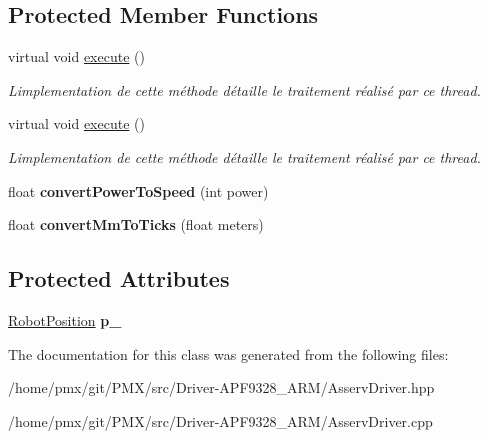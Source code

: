 \subsection*{Protected Member Functions}
\begin{DoxyCompactItemize}
\item 
\mbox{\label{classAsservDriver_ae2fdf0d75abab4e2cc974706c8a81867}} 
virtual void \hyperlink{classAsservDriver_ae2fdf0d75abab4e2cc974706c8a81867}{execute} ()
\begin{DoxyCompactList}\small\item\em L\textquotesingle{}implementation de cette méthode détaille le traitement réalisé par ce thread. \end{DoxyCompactList}\item 
\mbox{\label{classAsservDriver_a43527b66274f2c5f0e8e88adcd7cced2}} 
virtual void \hyperlink{classAsservDriver_a43527b66274f2c5f0e8e88adcd7cced2}{execute} ()
\begin{DoxyCompactList}\small\item\em L\textquotesingle{}implementation de cette méthode détaille le traitement réalisé par ce thread. \end{DoxyCompactList}\item 
\mbox{\label{classAsservDriver_a10895a322108211299951538aa2ff614}} 
float {\bfseries convert\+Power\+To\+Speed} (int power)
\item 
\mbox{\label{classAsservDriver_a05bd91c77a979511dda5d0e901ddf6e6}} 
float {\bfseries convert\+Mm\+To\+Ticks} (float meters)
\end{DoxyCompactItemize}
\subsection*{Protected Attributes}
\begin{DoxyCompactItemize}
\item 
\mbox{\label{classAsservDriver_a46204e282e8f3174a8dc42ba81f10e47}} 
\hyperlink{structRobotPosition}{Robot\+Position} {\bfseries p\+\_\+}
\end{DoxyCompactItemize}


The documentation for this class was generated from the following files\+:\begin{DoxyCompactItemize}
\item 
/home/pmx/git/\+P\+M\+X/src/\+Driver-\/\+A\+P\+F9328\+\_\+\+A\+R\+M/Asserv\+Driver.\+hpp\item 
/home/pmx/git/\+P\+M\+X/src/\+Driver-\/\+A\+P\+F9328\+\_\+\+A\+R\+M/Asserv\+Driver.\+cpp\end{DoxyCompactItemize}
